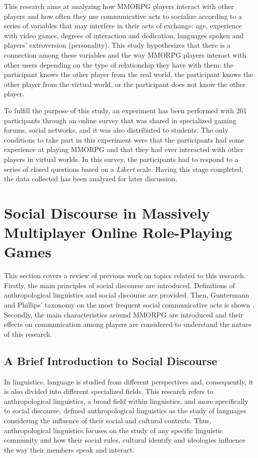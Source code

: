 \documentclass[english]{textolivre}
\begin{document}
This research aims at analyzing how MMORPG players interact with other players and how often they use communicative acts to socialize according to a series of variables that may interfere in their acts of exchange: age, experience with video games, degrees of interaction and dedication, languages spoken and players’ extroversion (personality). This study hypothesizes that there is a connection among these variables and the way MMORPG players interact with other users depending on the type of relationship they have with them: the participant knows the other player from the real world, the participant knows the other player from the virtual world, or the participant does not know the other player. 

To fulfill the purpose of this study, an experiment has been performed with 201 participants through an online survey that was shared in specialized gaming forums, social networks, and it was also distributed to students. The only conditions to take part in this experiment were that the participants had some experience at playing MMORPG and that they had ever interacted with other players in virtual worlds. In this survey, the participants had to respond to a series of closed questions based on a \emph{Likert} scale. Having this stage completed, the data collected has been analyzed for later discussion. 

\section{Social Discourse in Massively Multiplayer Online Role-Playing Games}
This section covers a review of previous work on topics related to this research. Firstly, the main principles of social discourse are introduced. Definitions of anthropological linguistics and social discourse are provided. Then, Guntermann and Phillips’ taxonomy on the most frequent social communicative acts is shown \cite*[p. 26]{guntermann1982}. Secondly, the main characteristics around MMORPG are introduced and their effects on communication among players are considered to understand the nature of this research. 

\subsection{A Brief Introduction to Social Discourse}
In linguistics, language is studied from different perspectives and, consequently, it is also divided into different specialized fields. This research refers to anthropological linguistics, a broad field within linguistics, and more specifically to social discourse. \textcite{foley1997} defined anthropological linguistics as the study of languages considering the influence of their social and cultural contexts. Thus, anthropological linguistics focuses on the study of any specific linguistic community and how their social rules, cultural identify and ideologies influence the way their members speak and interact. 
\end{document}
